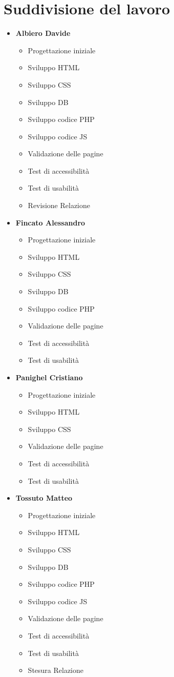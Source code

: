 \section{Suddivisione del lavoro}
\begin{itemize}
	\item \textbf{Albiero Davide}
	\begin{itemize}
		\item Progettazione iniziale
		\item Sviluppo HTML
		\item Sviluppo CSS
		\item Sviluppo DB
		\item Sviluppo codice PHP
		\item Sviluppo codice JS
		\item Validazione delle pagine
		\item Test di accessibilità
		\item Test di usabilità
		\item Revisione Relazione
	\end{itemize}
	\item \textbf{Fincato Alessandro}
	\begin{itemize}
		\item Progettazione iniziale
		\item Sviluppo HTML
		\item Sviluppo CSS
		\item Sviluppo DB
		\item Sviluppo codice PHP
		\item Validazione delle pagine
		\item Test di accessibilità
		\item Test di usabilità
	\end{itemize}
	\item \textbf{Panighel Cristiano}
	\begin{itemize}
		\item Progettazione iniziale
		\item Sviluppo HTML
		\item Sviluppo CSS
		\item Validazione delle pagine
		\item Test di accessibilità
		\item Test di usabilità
	\end{itemize}
	\item \textbf{Tossuto Matteo}
	\begin{itemize}
		\item Progettazione iniziale
		\item Sviluppo HTML
		\item Sviluppo CSS
		\item Sviluppo DB
		\item Sviluppo codice PHP
		\item Sviluppo codice JS
		\item Validazione delle pagine
		\item Test di accessibilità
		\item Test di usabilità
		\item Stesura Relazione
	\end{itemize}
\end{itemize}

